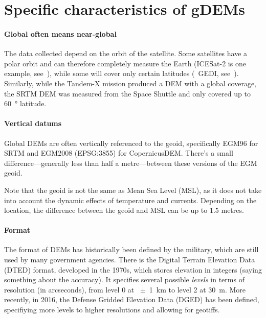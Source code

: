 %
\section[Specific characteristics]{Specific characteristics of gDEMs}

\paragraph{Global often means near-global}

The data collected depend on the orbit of the satellite.
Some satellites have a polar orbit and can therefore completely measure the Earth (ICESat-2 is one example, see~), while some will cover only certain latitudes (\eg\ GEDI, see~).
Similarly, while the Tandem-X mission produced a DEM with a global coverage, the SRTM DEM was measured from the Space Shuttle and only covered up to \qty{60}{\degree} latitude.


\paragraph{Vertical datums}
Global DEMs are often vertically referenced to the geoid, specifically EGM96 for SRTM and EGM2008 (EPSG:3855) for CopernicusDEM.
There's a small difference---generally less than half a metre---between these versions of the EGM geoid.

Note that the geoid is not the same as Mean Sea Level (MSL), as it does not take into account the dynamic effects of temperature and currents.
Depending on the location, the difference between the geoid and MSL can be up to 1.5 metres.

\paragraph{Format}  %
The format of DEMs has historically been defined by the military, which are still used by many government agencies.
There is the Digital Terrain Elevation Data (DTED) format, developed in the 1970s, which stores elevation in integers (saying something about the accuracy).
It specifies several possible \emph{levels} in terms of resolution (in arcseconds), from level 0 at \qty{\pm1}{km} to level 2 at \qty{30}{m}.
More recently, in 2016, the Defense Gridded Elevation Data (DGED) has been defined, specifiying more levels to higher resolutions and allowing for geotiffs.

